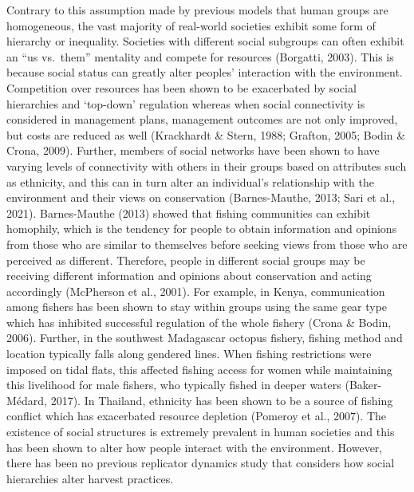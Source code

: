 \documentclass[
  12pt,
]{article}
\begin{document}
Contrary to this assumption made by previous models that human groups are homogeneous, the vast majority of real-world societies exhibit some form of hierarchy or inequality. Societies with different social subgroups can often exhibit an ``us vs.~them'' mentality and compete for resources (Borgatti, 2003). This is because social status can greatly alter peoples' interaction with the environment. Competition over resources has been shown to be exacerbated by social hierarchies and `top-down' regulation whereas when social connectivity is considered in management plans, management outcomes are not only improved, but costs are reduced as well (Krackhardt \& Stern, 1988; Grafton, 2005; Bodin \& Crona, 2009). Further, members of social networks have been shown to have varying levels of connectivity with others in their groups based on attributes such as ethnicity, and this can in turn alter an individual's relationship with the environment and their views on conservation (Barnes-Mauthe, 2013; Sari et al., 2021). Barnes-Mauthe (2013) showed that fishing communities can exhibit homophily, which is the tendency for people to obtain information and opinions from those who are similar to themselves before seeking views from those who are perceived as different. Therefore, people in different social groups may be receiving different information and opinions about conservation and acting accordingly (McPherson et al., 2001). For example, in Kenya, communication among fishers has been shown to stay within groups using the same gear type which has inhibited successful regulation of the whole fishery (Crona \& Bodin, 2006). Further, in the southwest Madagascar octopus fishery, fishing method and location typically falls along gendered lines. When fishing restrictions were imposed on tidal flats, this affected fishing access for women while maintaining this livelihood for male fishers, who typically fished in deeper waters (Baker-Médard, 2017). In Thailand, ethnicity has been shown to be a source of fishing conflict which has exacerbated resource depletion (Pomeroy et al., 2007). The existence of social structures is extremely prevalent in human societies and this has been shown to alter how people interact with the environment. However, there has been no previous replicator dynamics study that considers how social hierarchies alter harvest practices.
\end{document}
